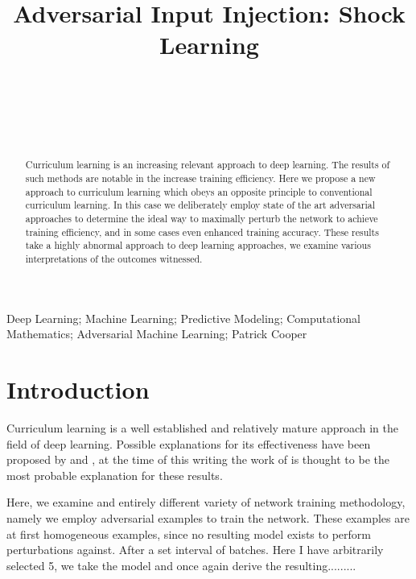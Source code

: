 \documentclass{article}
\begin{document}
\title{Adversarial Input Injection: Shock Learning%
%
}

\author{\\[2pt] 
\\
\\
\\
\and
}

\maketitle

\begin{abstract}
Curriculum learning is an increasing relevant approach to deep learning. The results of such methods are notable in the increase training efficiency. Here we propose a new approach to curriculum learning which obeys an opposite principle to conventional curriculum learning. In this case we deliberately employ state of the art adversarial approaches to determine the ideal way to maximally perturb the network to achieve training efficiency, and in some cases even enhanced training accuracy. These results take a highly abnormal approach to deep learning approaches, we examine various interpretations of the outcomes witnessed.
\end{abstract}

\begin{keywords}
Deep Learning; Machine Learning; Predictive Modeling; Computational Mathematics; Adversarial Machine Learning; Patrick Cooper
\end{keywords}

\section{Introduction}
\label{intro}
Curriculum learning is a well established and relatively mature approach in the field of deep learning. Possible explanations for its effectiveness have been proposed by  and , at the time of this writing the work of  is thought to be the most probable explanation for these results.

Here, we examine and entirely different variety of network training methodology, namely we employ adversarial examples to train the network. These examples are at first homogeneous examples, since no resulting model exists to perform perturbations against. After a set interval of batches. Here I have arbitrarily selected 5, we take the model and once again derive the resulting.........
\end{document}
